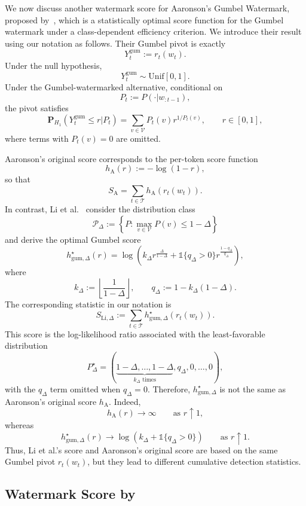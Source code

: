 \documentclass{article}
\theoremstyle{plain}
\theoremstyle{definition}
\begin{document}
We now discuss another watermark score for Aaronson's Gumbel Watermark, proposed by~\citep{li2025statistical}, which is a statistically optimal score function for the Gumbel watermark under a class-dependent efficiency criterion. 
We introduce their result using our notation as follows. 
Their Gumbel pivot is exactly
\[
Y_t^{\mathrm{gum}}
:=
r_t(w_t).
\]
Under the null hypothesis,
\[
Y_t^{\mathrm{gum}}\sim\mathrm{Unif}[0,1].
\]
Under the Gumbel-watermarked alternative, conditional on
\[
P_t:=P(\cdot|w_{:t-1}),
\]
the pivot satisfies
\[
\mathbf{P}_{H_1}\!\left(Y_t^{\mathrm{gum}}\leq r| P_t\right)
=
\sum_{v\in\mathcal{V}}P_t(v)r^{1/P_t(v)},
\qquad r\in[0,1],
\]
where terms with $P_t(v)=0$ are omitted.

Aaronson's original score corresponds to the per-token score function
\[
h_{\mathrm{A}}(r):=-\log(1-r),
\]
so that
\[
S_{\mathrm{A}}
=
\sum_{t\in\mathcal{T}}h_{\mathrm{A}}(r_t(w_t)).
\]
In contrast, Li et al.~\citep{li2025statistical} consider the distribution class
\[
\mathcal{P}_{\Delta}
:=
\left\{
P:\max_{v\in\mathcal{V}}P(v)\leq 1-\Delta
\right\}
\]
and derive the optimal Gumbel score
\[
h^\star_{\mathrm{gum},\Delta}(r)
=
\log\left(
k_\Delta r^{\frac{\Delta}{1-\Delta}}
+
\mathds{1}\{q_\Delta>0\}
r^{\frac{1-q_\Delta}{q_\Delta}}
\right),
\]
where
\[
k_\Delta
:=
\left\lfloor\frac{1}{1-\Delta}\right\rfloor,
\qquad
q_\Delta
:=
1-k_\Delta(1-\Delta).
\]
The corresponding statistic in our notation is
\[
S_{\mathrm{Li},\Delta}
:=
\sum_{t\in\mathcal{T}}
h^\star_{\mathrm{gum},\Delta}(r_t(w_t)).
\]
This score is the log-likelihood ratio associated with the least-favorable distribution
\[
P_\Delta^\star
=
(\underbrace{1-\Delta,\ldots,1-\Delta}_{k_\Delta\text{ times}},
q_\Delta,0,\ldots,0),
\]
with the $q_\Delta$ term omitted when $q_\Delta=0$.
Therefore, $h^\star_{\mathrm{gum},\Delta}$ is not the same as Aaronson's original score $h_{\mathrm{A}}$.
Indeed,
\[
h_{\mathrm{A}}(r)\to\infty
\qquad\text{as }r\uparrow 1,
\]
whereas
\[
h^\star_{\mathrm{gum},\Delta}(r)
\to
\log\left(k_\Delta+\mathds{1}\{q_\Delta>0\}\right)
\qquad\text{as }r\uparrow 1.
\]
Thus, Li et al.'s score and Aaronson's original score are based on the same Gumbel pivot
$r_t(w_t)$, but they lead to different cumulative detection statistics.



\subsection{Watermark Score by~\citep{lattimore2026refined}}
\end{document}
